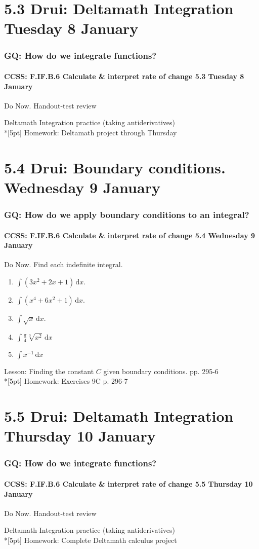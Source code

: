 \documentclass{beamer}
\begin{document}
\section{5.3 Drui: Deltamath Integration Tuesday 8 January}
  \frame
  {
    \frametitle{GQ: How do we integrate functions?}
    \framesubtitle{CCSS: F.IF.B.6 Calculate \& interpret rate of change \hfill \alert{5.3  Tuesday 8 January}}

    \begin{block}{Do Now. Handout-test review}

    \end{block}
    Deltamath Integration practice (taking antiderivatives)\\*[5pt]
    Homework: Deltamath project through Thursday
  }

\section{5.4 Drui: Boundary conditions. Wednesday 9 January}
  \frame
  {
  \frametitle{GQ: How do we apply boundary conditions to an integral?}
  \framesubtitle{CCSS: F.IF.B.6 Calculate \& interpret rate of change \hfill \alert{5.4 Wednesday 9 January}}

  \begin{block}{Do Now. Find each indefinite integral.}
  \begin{enumerate}
      \item $\int (3x^2+2x+1) \,\mathrm{d}x$.
      \item $\int (x^4+6x^2+1) \,\mathrm{d}x$.
      \item $\int \sqrt{x} \,\mathrm{d}x$.
      \item $\displaystyle \int \frac{\pi}{4} \sqrt[3]{x^2} \,\mathrm{d}x$
      \item $\int x^{-1} \,\mathrm{d}x$
  \end{enumerate}
  \end{block}
  Lesson: Finding the constant $C$ given boundary conditions. pp. 295-6\\*[5pt]
  Homework: Exercises 9C p. 296-7
}

\section{5.5 Drui: Deltamath Integration Thursday 10 January}
  \frame
  {
  \frametitle{GQ: How do we integrate functions?}
  \framesubtitle{CCSS: F.IF.B.6 Calculate \& interpret rate of change \hfill \alert{5.5  Thursday 10 January}}

  \begin{block}{Do Now. Handout-test review}

  \end{block}
  Deltamath Integration practice (taking antiderivatives)\\*[5pt]
  Homework: Complete Deltamath calculus project
}
\end{document}
